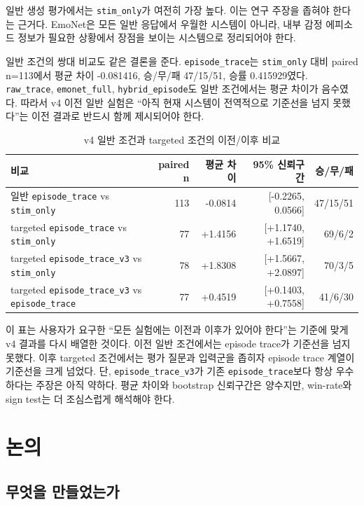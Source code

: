 \documentclass[11pt,a4paper]{article}
\newcommand{\eng}[1]{\texttt{#1}}
\begin{document}
일반 생성 평가에서는 \eng{stim\_only}가 여전히 가장 높다. 이는 연구 주장을 좁혀야 한다는 근거다. EmoNet은 모든 일반 응답에서 우월한 시스템이 아니라, 내부 감정 에피소드 정보가 필요한 상황에서 장점을 보이는 시스템으로 정리되어야 한다.

일반 조건의 쌍대 비교도 같은 결론을 준다. \eng{episode\_trace}는 \eng{stim\_only} 대비 paired n=113에서 평균 차이 -0.081416, 승/무/패 47/15/51, 승률 0.415929였다. \eng{raw\_trace}, \eng{emonet\_full}, \eng{hybrid\_episode}도 일반 조건에서는 평균 차이가 음수였다. 따라서 v4 이전 일반 실험은 ``아직 현재 시스템이 전역적으로 기준선을 넘지 못했다''는 이전 결과로 반드시 함께 제시되어야 한다.

\begin{table}[h]
\centering
\caption{v4 일반 조건과 targeted 조건의 이전/이후 비교}
\begin{tabularx}{\linewidth}{lrrrr}
\toprule
비교 & paired n & 평균 차이 & 95\% 신뢰구간 & 승/무/패 \\
\midrule
일반 \eng{episode\_trace} vs \eng{stim\_only} & 113 & -0.0814 & [-0.2265, 0.0566] & 47/15/51 \\
targeted \eng{episode\_trace} vs \eng{stim\_only} & 77 & +1.4156 & [+1.1740, +1.6519] & 69/6/2 \\
targeted \eng{episode\_trace\_v3} vs \eng{stim\_only} & 78 & +1.8308 & [+1.5667, +2.0897] & 70/3/5 \\
targeted \eng{episode\_trace\_v3} vs \eng{episode\_trace} & 77 & +0.4519 & [+0.1403, +0.7558] & 41/6/30 \\
\bottomrule
\end{tabularx}
\end{table}

이 표는 사용자가 요구한 ``모든 실험에는 이전과 이후가 있어야 한다''는 기준에 맞게 v4 결과를 다시 배열한 것이다. 이전 일반 조건에서는 episode trace가 기준선을 넘지 못했다. 이후 targeted 조건에서는 평가 질문과 입력군을 좁히자 episode trace 계열이 기준선을 크게 넘었다. 단, \eng{episode\_trace\_v3}가 기존 \eng{episode\_trace}보다 항상 우수하다는 주장은 아직 약하다. 평균 차이와 bootstrap 신뢰구간은 양수지만, win-rate와 sign test는 더 조심스럽게 해석해야 한다.

\section{논의}

\subsection{무엇을 만들었는가}
\end{document}
